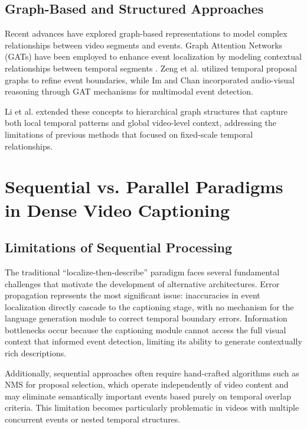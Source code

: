 \subsection{Graph-Based and Structured Approaches}
Recent advances have explored graph-based representations to model complex relationships between video segments and events.
Graph Attention Networks (GATs) have been employed to enhance event localization by modeling contextual relationships between temporal segments \cite{Im2024-ah,Chan2024-jd}.
Zeng et al. \cite{Zeng2024-graph} utilized temporal proposal graphs to refine event boundaries, while Im and Chan \cite{Im2023-multimodal} incorporated audio-visual reasoning through GAT mechanisms for multimodal event detection.

Li et al. \cite{Li2023-hvgr} extended these concepts to hierarchical graph structures that capture both local temporal patterns and global video-level context, addressing the limitations of previous methods that focused on fixed-scale temporal relationships.

\section{Sequential vs. Parallel Paradigms in Dense Video Captioning}
\label{sec:sequential_vs_parallel}

\subsection{Limitations of Sequential Processing}
The traditional ``localize-then-describe'' paradigm faces several fundamental challenges that motivate the development of alternative architectures.
Error propagation represents the most significant issue: inaccuracies in event localization directly cascade to the captioning stage, with no mechanism for the language generation module to correct temporal boundary errors.
Information bottlenecks occur because the captioning module cannot access the full visual context that informed event detection, limiting its ability to generate contextually rich descriptions.

Additionally, sequential approaches often require hand-crafted algorithms such as NMS for proposal selection, which operate independently of video content and may eliminate semantically important events based purely on temporal overlap criteria.
This limitation becomes particularly problematic in videos with multiple concurrent events or nested temporal structures.

